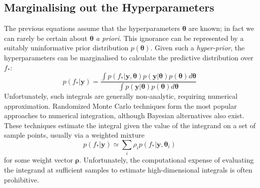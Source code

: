 \documentclass{article}
\newcommand\jansays[1]{\textcolor{blue}{Jan says: #1}}
\newcommand{\vect}[1]{\mathbf{#1}}
\newcommand{\yd}{\vect{y}}
\renewcommand{\sc}[1]{{\scshape #1}}
\begin{document}
\subsection{Marginalising out the Hyperparameters}
The previous equations assume that the hyperparameters $\bm{\theta}$ are known; in fact we can rarely be certain about $\bm{\theta}$ \emph{a priori}. This ignorance can be represented by a suitably uninformative prior distribution $p(\bm{\theta})$. Given such a \emph{hyper-prior}, the hyperparameters can be marginalised to calculate the predictive distribution over $f_*$:
\begin{equation}\label{fullmargint}
p(f_* |\yd) = \frac{\int p(f_* | \yd,\bm{\theta})p(\yd|\bm{\theta})p(\bm{\theta})d\bm{\theta}}{\int p(\yd|\bm{\theta})p(\bm{\theta})d\bm{\theta}}
\end{equation}
Unfortunately, such integrals are generally non-analytic, requiring numerical approximation. Randomized Monte Carlo techniques \cite{chen2000monte} form the most popular approaches to numerical integration, although Bayesian alternatives \cite{bayesquad, osbornebayesquad} also exist. 
These techniques estimate the integral given
the value of the integrand on a set of sample points, usually via a weighted mixture
\begin{equation}\label{sampling}
p(f_* |\yd) \simeq \sum_i \rho_i p(f_* | \yd,\bm{\theta}_i)
\end{equation}
for some weight vector $\bm{\rho}$. Unfortunately, the computational expense of evaluating the integrand at sufficient samples to estimate high-dimensional integrals is often prohibitive. %
\end{document}
